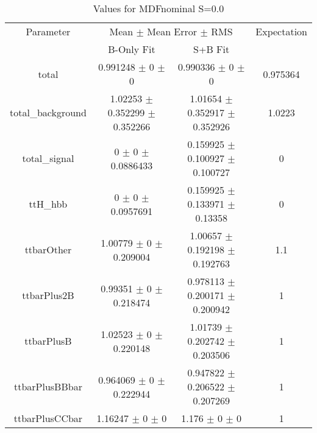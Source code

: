 \begin{table}
\centering
\caption{Values for MDFnominal S=0.0}
\begin{tabular}{cccc}
\toprule
Parameter & \multicolumn{2}{c}{Mean $\pm$ Mean Error $\pm$ RMS} & Expectation\\
 & B-Only Fit & S+B Fit & \\
\midrule
total & \num{0.991248} $\pm$ \num{0} $\pm$ \num{0} & \num{0.990336} $\pm$ \num{0} $\pm$ \num{0} & \num{0.975364}\\
total\_background & \num{1.02253} $\pm$ \num{0.352299} $\pm$ \num{0.352266} & \num{1.01654} $\pm$ \num{0.352917} $\pm$ \num{0.352926} & \num{1.0223}\\
total\_signal & \num{0} $\pm$ \num{0} $\pm$ \num{0.0886433} & \num{0.159925} $\pm$ \num{0.100927} $\pm$ \num{0.100727} & \num{0}\\
ttH\_hbb & \num{0} $\pm$ \num{0} $\pm$ \num{0.0957691} & \num{0.159925} $\pm$ \num{0.133971} $\pm$ \num{0.13358} & \num{0}\\
ttbarOther & \num{1.00779} $\pm$ \num{0} $\pm$ \num{0.209004} & \num{1.00657} $\pm$ \num{0.192198} $\pm$ \num{0.192763} & \num{1.1}\\
ttbarPlus2B & \num{0.99351} $\pm$ \num{0} $\pm$ \num{0.218474} & \num{0.978113} $\pm$ \num{0.200171} $\pm$ \num{0.200942} & \num{1}\\
ttbarPlusB & \num{1.02523} $\pm$ \num{0} $\pm$ \num{0.220148} & \num{1.01739} $\pm$ \num{0.202742} $\pm$ \num{0.203506} & \num{1}\\
ttbarPlusBBbar & \num{0.964069} $\pm$ \num{0} $\pm$ \num{0.222944} & \num{0.947822} $\pm$ \num{0.206522} $\pm$ \num{0.207269} & \num{1}\\
ttbarPlusCCbar & \num{1.16247} $\pm$ \num{0} $\pm$ \num{0} & \num{1.176} $\pm$ \num{0} $\pm$ \num{0} & \num{1}\\
\bottomrule
\end{tabular}
\end{table}